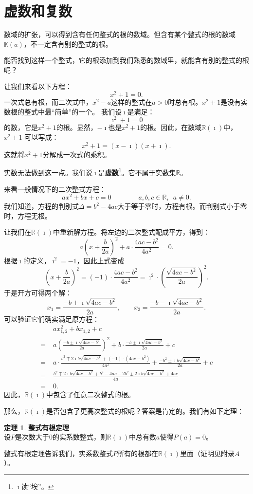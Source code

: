 \documentclass[12pt,UTF8]{ctexbook}
\theoremstyle{definition}
\newtheorem{tm}{定理}[section]
\theoremstyle{plain}
\begin{document}
\section{虚数和复数}

数域的扩张，可以得到含有任何整式的根的数域。但含有某个整式的根的数域$\mathbb{K}(a)$，不一定含有别的整式的根。

能否找到这样一个整式，它的根添加到我们熟悉的数域里，就能含有别的整式的根呢？

让我们来看以下方程：
$$ x^2 + 1 = 0.$$
一次式总有根，而二次式中，$x^2 - a$这样的整式在$a>0$时总有根。$x^2 + 1$是没有实数根的整式中最“简单”的一个。
我们设$\imath$是满足：
$$ \imath^2 + 1 = 0$$
的数，它是$x^2 + 1$的根。显然，$-\imath$也是$x^2 + 1$的根。因此，在数域$\mathbb{R}(\imath)$中，$x^2 + 1$
可以写成：
$$ x^2 + 1 = (x - \imath)(x + \imath).$$
这就将$x^2 + 1$分解成一次式的乘积。

实数无法做到这一点。我们说$\imath$是\textbf{虚数}\footnote{$\imath$读“埃”。}。它不属于实数集$\mathbb{R}$。

来看一般情况下的二次整式方程：
$$ ax^2 + bx + c = 0  \qquad \qquad a,b,c \in \mathbb{R}, \,\,\, a \neq 0. $$
我们知道，方程的判别式$\Delta = b^2 - 4ac$大于等于零时，方程有根。而判别式小于零时，方程无根。

让我们在$\mathbb{R}(\imath)$中重新解方程。将左边的二次整式配成平方，得到：
$$ a(x + \frac{b}{2a})^2 + a\cdot \frac{4ac - b^2}{4a^2} = 0. $$
根据$\imath$的定义，$\imath^2 = -1$，因此上式变成
$$ \left(x + \frac{b}{2a}\right)^2 = (-1) \cdot \frac{4ac - b^2}{4a^2} = \imath^2 \cdot \left(\frac{\sqrt{4ac - b^2}}{2a}\right)^2. $$
于是开方可得两个解：
$$ x_1 = \frac{-b + \imath \sqrt{4ac - b^2} }{2a}, \qquad x_2 = \frac{-b - \imath \sqrt{4ac - b^2} }{2a}. $$
可以验证它们确实满足原方程：
\begin{align*}
     &\; ax_{1,2}^2 + b x_{1,2} + c  \\
    =&\; a\left(\frac{-b \pm \imath \sqrt{4ac - b^2} }{2a}\right)^2 + b\cdot \frac{-b \pm \imath \sqrt{4ac - b^2} }{2a} + c \\
    =&\; a \cdot \frac{b^2 \mp 2\imath b \sqrt{4ac - b^2} + (-1)\cdot (4ac - b^2) }{4a^2} + \frac{-b^2 \pm \imath b \sqrt{4ac - b^2} }{2a} + c \\
    =&\; \frac{b^2 \mp 2\imath b \sqrt{4ac - b^2} + b^2 - 4ac -2b^2 \pm 2 \imath b \sqrt{4ac - b^2} + 4ac }{4a} \\
    =&\; 0.
\end{align*}
因此，$\mathbb{R}(\imath)$中包含了任意二次整式的根。

那么，$\mathbb{R}(\imath)$是否包含了更高次整式的根呢？答案是肯定的。我们有如下定理：
\begin{tm}{\textbf{整式有根定理}}
    \mbox{} \\
    \indent 设$P$是次数大于$0$的实系数整式，则$\mathbb{R}(\imath)$中总有数$a$使得$P(a) = 0$。
\end{tm}
整式有根定理告诉我们，实系数整式$P$所有的根都在$\mathbb{R}(\imath)$里面（证明见附录$A$）。
\end{document}
